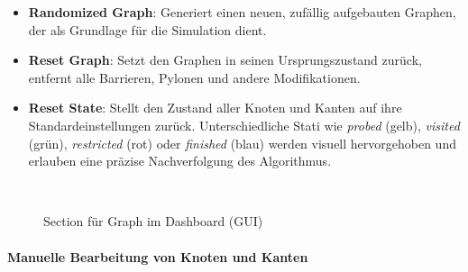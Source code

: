 \documentclass[main.tex]{subfiles} %
\begin{document}
\begin{itemize}
  \item \textbf{Randomized Graph}:
    Generiert einen neuen, zufällig aufgebauten Graphen, der als
    Grundlage für die Simulation dient.

  \item \textbf{Reset Graph}:
    Setzt den Graphen in seinen Ursprungszustand zurück, entfernt
    alle Barrieren, Pylonen und andere Modifikationen.

  \item \textbf{Reset State}:
    Stellt den Zustand aller Knoten und Kanten auf ihre
    Standardeinstellungen zurück. Unterschiedliche Stati wie
    \emph{probed} (gelb), \emph{visited} (grün), \emph{restricted}
    (rot) oder \emph{finished} (blau) werden visuell hervorgehoben
    und erlauben eine präzise Nachverfolgung des Algorithmus.
\end{itemize}

\begin{figure}[H]
  \centering
  \caption{Section für Graph im Dashboard (GUI)}~\label{fig:DashboardGraph}
\end{figure}

\paragraph{Manuelle Bearbeitung von Knoten und Kanten}
\end{document}
